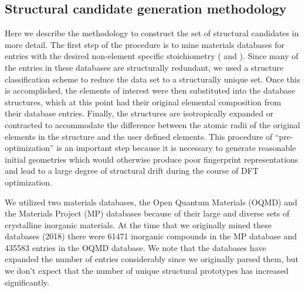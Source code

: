 

\subsection{Structural candidate generation methodology}
%

%
Here we describe the methodology to construct the set of structural candidates in more detail.
%
The first step of the procedure is to mine materials databases for entries with the desired non-element specific stoichiometry ( \ABtwo and \ABthree).
%
Since many of the entries in these databases are structurally redundant,
we used a structure classification scheme to reduce the data set to a structurally unique set.
%
Once this is accomplished, the elements of interest were then substituted into the database structures,
which at this point had their original elemental composition from their database entries.
%
Finally, the structures are isotropically expanded or contracted to accommodate the difference between the atomic radii of the original elements in the structure and the user defined elements.
%
This procedure of ``pre-optimization'' is an important step because
it is necessary to generate reasonable initial geometries which would otherwise produce poor fingerprint representations and lead to a large degree of structural drift during the course of DFT optimization.


%
We utilized two materials databases, the Open Quantum Materials (OQMD)\cite{Saal2013} and the Materials Project (MP) databases\cite{Jain2013} because of their large and diverse sets of crystalline inorganic materials.
%
At the time that we originally mined these databases (2018) there were \num{61471} inorganic compounds in the MP database and \num{435583} entries in the OQMD database.
%
We note that the databases have expanded the number of entries considerably since we originally parsed them,
but we don't expect that the number of unique structural prototypes has increased significantly.


